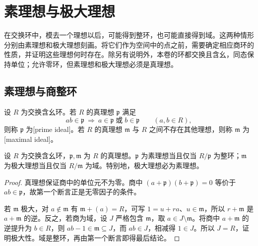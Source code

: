 
\section{素理想与极大理想}
\label{b3:sec:0101}

在交换环中，模去一个理想以后，可能得到整环，也可能直接得到域。这两种情形分别由素理想和极大理想刻画。将它们作为空间中的点之前，需要确定相应商环的性质，并证明这些理想何时存在。除另有说明外，本卷的环都交换且含幺，同态保持单位；允许零环，但素理想和极大理想必须是真理想。

\subsection{素理想与商整环}
\label{b3:subsec:0101:01}

\begin{definition}\label{b3:def:prime-maximal}
	设 \(R\) 为交换含幺环。若 \(R\) 的真理想 \(\mathfrak p\) 满足
	\[
		ab\in\mathfrak p\ \Longrightarrow\ a\in\mathfrak p\;\text{或}\;b\in\mathfrak p \qquad(a,b\in R),
	\]
	则称 \(\mathfrak p\) 为[prime ideal]。若 \(R\) 的真理想 \(\mathfrak m\) 与 \(R\) 之间不存在其他理想，则称 \(\mathfrak m\) 为[maximal ideal]。
\end{definition}

\begin{proposition}\label{b3:prop:prime-maximal-quotient}
	设 \(R\) 为交换含幺环，\(\mathfrak p,\mathfrak m\) 为 \(R\) 的真理想。\(\mathfrak p\) 为素理想当且仅当 \(R/\mathfrak p\) 为整环；\(\mathfrak m\) 为极大理想当且仅当 \(R/\mathfrak m\) 为域。特别地，极大理想必为素理想。
\end{proposition}
\begin{proof}
	真理想保证商中的单位元不为零。商中 \((a+\mathfrak p)(b+\mathfrak p)=0\) 等价于 \(ab\in\mathfrak p\)，故第一个断言正是无零因子的条件。

	若 \(\mathfrak m\) 极大，对 \(a\notin\mathfrak m\) 有 \(\mathfrak m+(a)=R\)，可写 \(1=u+ra\)、\(u\in\mathfrak m\)，所以 \(r+\mathfrak m\) 是 \(a+\mathfrak m\) 的逆。反之，若商为域，设 \(J\) 严格包含 \(\mathfrak m\)，取 \(a\in J\setminus\mathfrak m\)。将商中 \(a+\mathfrak m\) 的逆提升为 \(b\in R\)，则 \(ab-1\in\mathfrak m\subseteq J\)，而 \(ab\in J\)，相减得 \(1\in J\)。所以 \(J=R\)，证明极大性。域是整环，再由第一个断言即得最后结论。
\end{proof}


